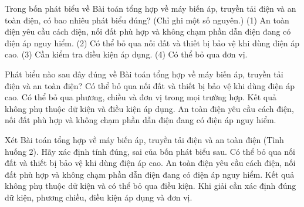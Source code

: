 \begin{ex}
Trong bốn phát biểu về Bài toán tổng hợp về máy biến áp, truyền tải điện và an toàn điện, có bao nhiêu phát biểu đúng? (Chỉ ghi một số nguyên.) (1) An toàn điện yêu cầu cách điện, nối đất phù hợp và không chạm phần dẫn điện đang có điện áp nguy hiểm. (2) Có thể bỏ qua nối đất và thiết bị bảo vệ khi dùng điện áp cao. (3) Cần kiểm tra điều kiện áp dụng. (4) Có thể bỏ qua đơn vị.
\end{ex}

\begin{ex}
Phát biểu nào sau đây đúng về Bài toán tổng hợp về máy biến áp, truyền tải điện và an toàn điện?
\choice
{Có thể bỏ qua nối đất và thiết bị bảo vệ khi dùng điện áp cao.}
{Có thể bỏ qua phương, chiều và đơn vị trong mọi trường hợp.}
{Kết quả không phụ thuộc dữ kiện và điều kiện áp dụng.}
{\True An toàn điện yêu cầu cách điện, nối đất phù hợp và không chạm phần dẫn điện đang có điện áp nguy hiểm.}
\end{ex}

\begin{ex}
Xét Bài toán tổng hợp về máy biến áp, truyền tải điện và an toàn điện (Tình huống 2). Hãy xác định tính đúng, sai của bốn phát biểu sau.
\choiceTF
{Có thể bỏ qua nối đất và thiết bị bảo vệ khi dùng điện áp cao.}
{\True An toàn điện yêu cầu cách điện, nối đất phù hợp và không chạm phần dẫn điện đang có điện áp nguy hiểm.}
{Kết quả không phụ thuộc dữ kiện và có thể bỏ qua điều kiện.}
{\True Khi giải cần xác định đúng dữ kiện, phương chiều, điều kiện áp dụng và đơn vị.}
\end{ex}

